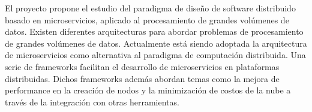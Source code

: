 
El proyecto propone el estudio del paradigma de diseño de software distribuido basado en microservicios, aplicado al procesamiento de grandes volúmenes de datos.
Existen diferentes arquitecturas para abordar problemas de procesamiento de grandes volúmenes de datos.
Actualmente está siendo adoptada la arquitectura de microservicios como alternativa al paradigma de computación distribuida.
Una serie de frameworks facilitan el desarrollo de microservicios en plataformas distribuidas.
Dichos frameworks además abordan temas como la mejora de performance en la creación de nodos y la minimización de costos de la nube a través de la integración con otras herramientas.\par
